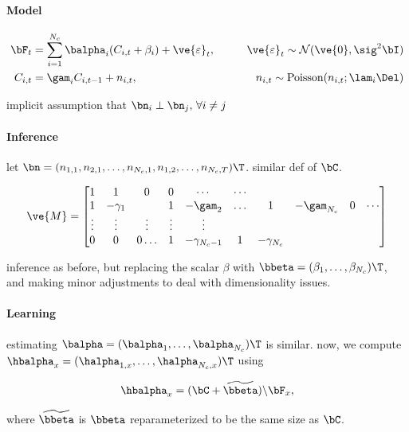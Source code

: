 \paragraph{Model}

\begin{align}
\bF_t &= \sum_{i=1}^{N_c}\balpha_i (C_{i,t} + \beta_i) +  \ve{\varepsilon}_t, \qquad &\ve{\varepsilon}_t \sim \mathcal{N}(\ve{0},\sig^2 \bI)   \\
C_{i,t} &= \gam_i C_{i,t-1} + n_{i,t}, & n_{i,t} \sim \text{Poisson}(n_{i,t}; \lam_i \Del)
\end{align}

implicit assumption that $\bn_i \perp \bn_j, \, \forall i\neq j$

\paragraph{Inference}

let $\bn=(n_{1,1}, n_{2,1}, \ldots, n_{N_c,1}, n_{1,2}, \ldots, n_{N_c,T})\T$. 
similar def of $\bC$.

\begin{align} \label{eq:M2}
\ve{M} = %
\begin{bmatrix}
1 & 1 & 0 & 0 & \cdots & \cdots \\
1 & -\gamma_1 & & 1 & -\gam_2 & \ldots & 1 & -\gam_{N_c}  & 0 & \cdots \\
\vdots & \vdots & \vdots & \vdots & \vdots  \\
0 & 0 & 0 \ldots & 1 & -\gamma_{N_c-1} & 1 & -\gamma_{N_c}
\end{bmatrix}
\end{align} 

inference as before, but replacing the scalar $\beta$ with $\bbeta=(\beta_1, \ldots, \beta_{N_c})\T$, and making minor adjustments to deal with dimensionality issues.

\paragraph{Learning}

estimating $\balpha=(\balpha_1,\ldots,\balpha_{N_c})\T$ is similar.  now, we compute $\hbalpha_x=(\halpha_{1,x}, \ldots, \halpha_{N_c,x})\T$ using

\begin{align}
\hbalpha_x = (\bC + \widetilde{\bbeta})\backslash \bF_x,
\end{align}

\noindent where $\widetilde{\bbeta}$ is $\bbeta$ reparameterized to be the same size as $\bC$.

